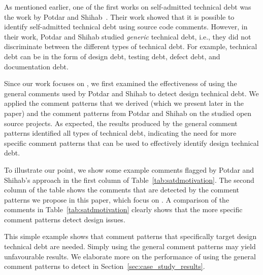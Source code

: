 As mentioned earlier, one of the first works on self-admitted technical debt was the work by Potdar and Shihab~\cite{Potdar2014ICSME}. Their work showed that it is possible to identify self-admitted technical debt using source code comments. However, in their work, Potdar and Shihab studied \textit{generic} technical debt, i.e., they did not discriminate between the different types of technical debt. For example, technical debt can be in the form of design debt, testing debt, defect debt, and documentation debt. 

Since our work focuses on \SADTD, we first examined the effectiveness of using the general comments used by Potdar and Shihab to detect design technical debt. We applied the comment patterns that we derived (which we present later in the paper) and the comment patterns from Potdar and Shihab on the studied open source projects. As expected, the results produced by the general comment patterns identified all types of technical debt, indicating the need for more specific comment patterns that can be used to effectively identify design technical debt.

To illustrate our point, we show some example comments flagged by Potdar and Shihab's approach in the first column of Table~\ref{tab:satdmotivation}. The second column of the table shows the comments that are detected by the comment patterns we propose in this paper, which focus on \SADTD. A comparison of the comments in Table~\ref{tab:satdmotivation} clearly shows that the more specific comment patterns detect design issues. 

This simple example shows that comment patterns that specifically target design technical debt are needed. Simply using the general comment patterns may yield unfavourable results. We elaborate more on the performance of using the general comment patterns to detect \SADTD in Section~\ref{sec:case_study_results}.


